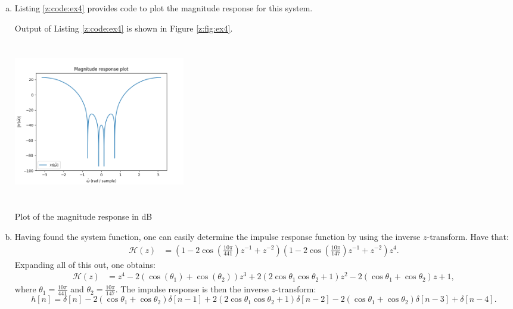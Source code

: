 \begin{enumerate}
\begin{enumerate}[a)]
\item Listing \ref{z:code:ex4} provides code to plot the magnitude response for this system.

Output of Listing \ref{z:code:ex4} is shown in Figure \ref{z:fig:ex4}.

\begin{marginfigure}
\includegraphics[width=7.5cm,height=7.0cm]{ch18/figures/mag2.png}
\caption{Plot of the magnitude response in dB}
\label{z:fig:ex4}
\end{marginfigure}

\item Having found the system function, one can easily determine the impulse response function by using the inverse $z$-transform. Have that:
\begin{align*}
    \mathcal{H}(z)&=(1-2\cos\left(\frac{10\pi}{441}\right)z^{-1}+z^{-2})(1-2\cos\left(\frac{10\pi}{147}\right)z^{-1}+z^{-2})z^{4}. 
\end{align*}
Expanding all of this out, one obtains:
\begin{align*}
    \mathcal{H}(z)&=z^{4} -2(\cos(\theta_1)+\cos(\theta_2))z^{3} + 2(2\cos\theta_1\cos\theta_2 + 1)z^{2} -2(\cos\theta_1+\cos\theta_2) z + 1,
\end{align*}
where $\theta_1=\frac{10\pi}{441}$ and $\theta_2=\frac{10\pi}{147}$. The impulse response is then the inverse $z$-transform:
$$h[n]=\delta[n]-2(\cos\theta_1+\cos\theta_2)\delta[n-1]+2(2\cos\theta_1\cos\theta_2+1)\delta[n-2]-2(\cos\theta_1+\cos\theta_2)\delta[n-3]+\delta[n-4].$$




\end{enumerate}




\end{enumerate}